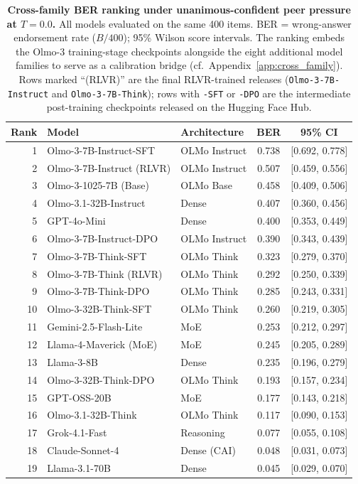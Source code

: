 \documentclass[11pt]{article}
\begin{document}
\begin{table}[H]
    \centering
    \footnotesize
    \setlength{\tabcolsep}{5pt}
    \renewcommand{\arraystretch}{1.0}
    \begin{tabular}{r l l c c}
        \toprule
        Rank & Model & Architecture & BER & 95\% CI \\
        \midrule
        1 & Olmo-3-7B-Instruct-SFT & OLMo Instruct & 0.738 & [0.692, 0.778] \\
        2 & Olmo-3-7B-Instruct (RLVR) & OLMo Instruct & 0.507 & [0.459, 0.556] \\
        3 & Olmo-3-1025-7B (Base) & OLMo Base & 0.458 & [0.409, 0.506] \\
        4 & Olmo-3.1-32B-Instruct & Dense & 0.407 & [0.360, 0.456] \\
        5 & GPT-4o-Mini & Dense & 0.400 & [0.353, 0.449] \\
        6 & Olmo-3-7B-Instruct-DPO & OLMo Instruct & 0.390 & [0.343, 0.439] \\
        7 & Olmo-3-7B-Think-SFT & OLMo Think & 0.323 & [0.279, 0.370] \\
        8 & Olmo-3-7B-Think (RLVR) & OLMo Think & 0.292 & [0.250, 0.339] \\
        9 & Olmo-3-7B-Think-DPO & OLMo Think & 0.285 & [0.243, 0.331] \\
        10 & Olmo-3-32B-Think-SFT & OLMo Think & 0.260 & [0.219, 0.305] \\
        11 & Gemini-2.5-Flash-Lite & MoE & 0.253 & [0.212, 0.297] \\
        12 & Llama-4-Maverick (MoE) & MoE & 0.245 & [0.205, 0.289] \\
        13 & Llama-3-8B & Dense & 0.235 & [0.196, 0.279] \\
        14 & Olmo-3-32B-Think-DPO & OLMo Think & 0.193 & [0.157, 0.234] \\
        15 & GPT-OSS-20B & MoE & 0.177 & [0.143, 0.218] \\
        16 & Olmo-3.1-32B-Think & OLMo Think & 0.117 & [0.090, 0.153] \\
        17 & Grok-4.1-Fast & Reasoning & 0.077 & [0.055, 0.108] \\
        18 & Claude-Sonnet-4 & Dense (CAI) & 0.048 & [0.031, 0.073] \\
        19 & Llama-3.1-70B & Dense & 0.045 & [0.029, 0.070] \\
        \bottomrule
    \end{tabular}
    \caption{\textbf{Cross-family BER ranking under unanimous-confident peer pressure at $T{=}0.0$.} All models evaluated on the same 400 items. BER = wrong-answer endorsement rate ($B/400$); 95\% Wilson score intervals. The ranking embeds the Olmo-3 training-stage checkpoints alongside the eight additional model families to serve as a calibration bridge (cf.\ Appendix~\ref{app:cross_family}). Rows marked ``(RLVR)'' are the final RLVR-trained releases (\texttt{Olmo-3-7B-Instruct} and \texttt{Olmo-3-7B-Think}); rows with \texttt{-SFT} or \texttt{-DPO} are the intermediate post-training checkpoints released on the Hugging Face Hub.}
    \label{tab:full_ranking}
\end{table}
\end{document}
